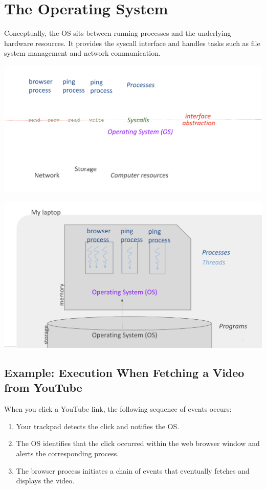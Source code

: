 \section{The Operating System}
Conceptually, the OS sits between running processes and the underlying hardware resources. It provides the syscall interface and handles tasks such as file system management and network communication. \\
\begin{minipage}{0.45\textwidth}
\begin{center}
  \includegraphics[width=1.15\textwidth]{chapters/L1/images/isa_os.png}
\end{center}
\end{minipage}
\hfill
\vline
\hfill
\begin{minipage}{0.45\textwidth}
\begin{center}
  \includegraphics[width=1.15\textwidth]{chapters/L1/images/os.png}
\end{center}
\end{minipage}

\subsection{Example: Execution When Fetching a Video from YouTube}
When you click a YouTube link, the following sequence of events occurs:
\begin{enumerate}
  \item Your trackpad detects the click and notifies the OS.
  \item The OS identifies that the click occurred within the web browser window and alerts the corresponding process.
  \item The browser process initiates a chain of events that eventually fetches and displays the video.
\end{enumerate}

